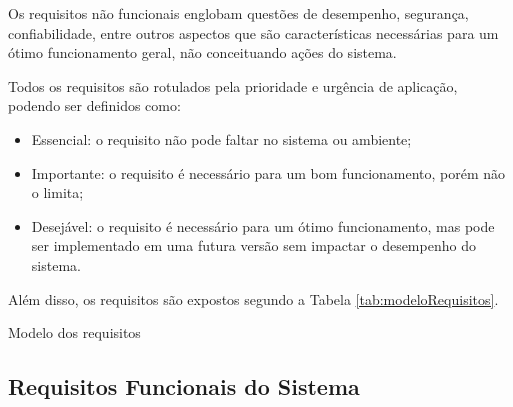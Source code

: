 Os requisitos não funcionais englobam questões de desempenho, segurança, confiabilidade, entre outros aspectos que são características necessárias para um ótimo funcionamento geral, não conceituando ações do sistema.

Todos os requisitos são rotulados pela prioridade e urgência de aplicação, podendo ser definidos como:
\begin{itemize}
    \item Essencial: o requisito não pode faltar no sistema ou ambiente;
    \item Importante: o requisito é necessário para um bom funcionamento, porém não o limita;
    \item Desejável: o requisito é necessário para um ótimo funcionamento, mas pode ser implementado em uma futura versão sem impactar o desempenho do sistema.
\end{itemize}
Além disso, os requisitos são expostos segundo a Tabela \ref{tab:modeloRequisitos}.

\begin{table}[H]
\centering
\caption{Modelo dos requisitos}
\label{tab:modeloRequisitos}
\caption*{Fonte: Autora (2023).}
\end{table}

\subsection{Requisitos Funcionais do Sistema}

